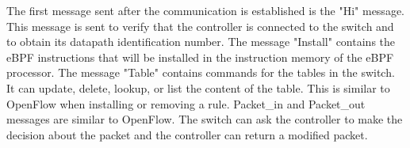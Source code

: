 The first message sent after the communication is established is the "Hi" message. 
This message is sent to verify that the controller is connected to the switch and to obtain its datapath identification number. 
The message "Install" contains the eBPF instructions that will be installed in the instruction memory of the eBPF processor. 
The message "Table" contains commands for the tables in the switch. It can update, delete, lookup, or list the content of the table. This is similar to OpenFlow when installing or removing a rule.
Packet\_in and Packet\_out messages are similar to OpenFlow. The switch can ask the controller to make the decision about the packet and the controller can return a modified packet.


